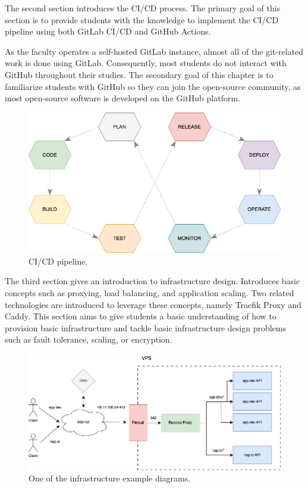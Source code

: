 \documentclass[
  digital,
  color,
  oneside,
  nosansbold,
  nocolorbold,
  lof,
  nolot,
]{fithesis4}
\begin{document}
The second section introduces the CI/CD process. The primary goal of this section is to provide students with the knowledge to implement the CI/CD pipeline using both GitLab CI/CD\cite{gitlab-cicd} and GitHub Actions\cite{github-actions}.

As the faculty operates a self-hosted GitLab instance, almost all of the git-related work is done using GitLab. Consequently, most students do not interact with GitHub throughout their studies. The secondary goal of this chapter is to familiarize students with GitHub so they can join the open-source community, as most open-source software is developed on the GitHub platform.

\begin{figure}[H]
    \centering
    \includegraphics[width=12cm]{figures/cicd.png}
    \caption{CI/CD pipeline.}
\end{figure}

The third section gives an introduction to infrastructure design. Introduces basic concepts such as proxying, load balancing, and application scaling. Two related technologies are introduced to leverage these concepts, namely Traefik Proxy\cite{traefik} and Caddy\cite{caddy}. This section aims to give students a basic understanding of how to provision basic infrastructure and tackle basic infrastructure design problems such as fault tolerance, scaling, or encryption.

\begin{figure}[H]
    \centering
    \includegraphics[width=12cm]{figures/infrastructure.png}
    \caption{One of the infrastructure example diagrams.}
\end{figure}
\end{document}
